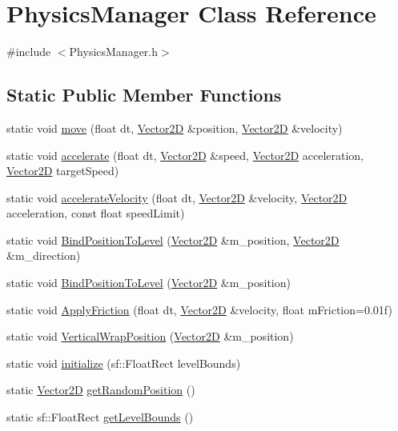 \hypertarget{class_physics_manager}{}\section{Physics\+Manager Class Reference}
\label{class_physics_manager}


{\ttfamily \#include $<$Physics\+Manager.\+h$>$}

\subsection*{Static Public Member Functions}
\begin{DoxyCompactItemize}
\item 
static void \hyperlink{class_physics_manager_afcc811e776c173c001762986adcfc731}{move} (float dt, \hyperlink{class_vector2_d}{Vector2D} \&position, \hyperlink{class_vector2_d}{Vector2D} \&velocity)
\item 
static void \hyperlink{class_physics_manager_ac91f12533b45cb7f7d66b82fbfd886fc}{accelerate} (float dt, \hyperlink{class_vector2_d}{Vector2D} \&speed, \hyperlink{class_vector2_d}{Vector2D} acceleration, \hyperlink{class_vector2_d}{Vector2D} target\+Speed)
\item 
static void \hyperlink{class_physics_manager_a74ec3035774192469d5e8560b80ddfd1}{accelerate\+Velocity} (float dt, \hyperlink{class_vector2_d}{Vector2D} \&velocity, \hyperlink{class_vector2_d}{Vector2D} acceleration, const float speed\+Limit)
\item 
static void \hyperlink{class_physics_manager_a75bfca00399793e604bcd749fa97c4ba}{Bind\+Position\+To\+Level} (\hyperlink{class_vector2_d}{Vector2D} \&m\+\_\+position, \hyperlink{class_vector2_d}{Vector2D} \&m\+\_\+direction)
\item 
static void \hyperlink{class_physics_manager_a8938f25d68d5e102f806ce7277814079}{Bind\+Position\+To\+Level} (\hyperlink{class_vector2_d}{Vector2D} \&m\+\_\+position)
\item 
static void \hyperlink{class_physics_manager_ad97cf48ec9c49605c4ca1be653cd0806}{Apply\+Friction} (float dt, \hyperlink{class_vector2_d}{Vector2D} \&velocity, float m\+Friction=0.\+01f)
\item 
static void \hyperlink{class_physics_manager_a754fec8e5f6ef692eb373d209689f897}{Vertical\+Wrap\+Position} (\hyperlink{class_vector2_d}{Vector2D} \&m\+\_\+position)
\item 
static void \hyperlink{class_physics_manager_aeae6dfda767bd621e02d44984ff7df8f}{initialize} (sf\+::\+Float\+Rect level\+Bounds)
\item 
static \hyperlink{class_vector2_d}{Vector2D} \hyperlink{class_physics_manager_a09f93d06f2a4a3855bedd13de9033fa5}{get\+Random\+Position} ()
\item 
static sf\+::\+Float\+Rect \hyperlink{class_physics_manager_ab6155905552f4740b0e5c9ee8a0de83f}{get\+Level\+Bounds} ()
\end{DoxyCompactItemize}


